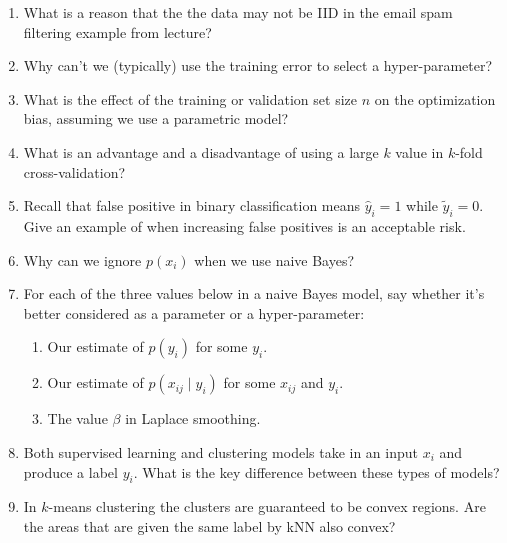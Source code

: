 \documentclass{article}
\begin{document}
    \begin{enumerate}
        \item What is a reason that the the data may not be IID in the email spam filtering example from lecture?

        \item Why can't we (typically) use the training error to select a hyper-parameter?

        \item What is the effect of the training or validation set size $n$ on the optimization bias, assuming we use a parametric model?

        \item What is an advantage and a disadvantage of using a large $k$ value in $k$-fold cross-validation?

        \item Recall that false positive in binary classification means $\hat y_i=1$ while $\tilde y_i = 0$. Give an example of when increasing false positives is an acceptable risk.

        \item Why can we ignore $p(x_i)$ when we use naive Bayes?

        \item For each of the three values below in a naive Bayes model, say whether it's better considered as a parameter or a hyper-parameter:
        \begin{enumerate}
            \item Our estimate of $p(y_i)$ for some $y_i$.
            \item Our estimate of $p(x_{ij} \mid y_i)$ for some $x_{ij}$ and $y_i$.
            \item The value $\beta$ in Laplace smoothing.
        \end{enumerate}

        \item Both supervised learning and clustering models take in an input $x_i$ and produce a label $y_i$. What is the key difference between these types of models?

        \item In $k$-means clustering the clusters are guaranteed to be convex regions. Are the areas that are given the same label by kNN also convex?
    \end{enumerate}
\end{document}
